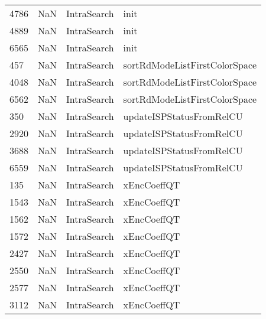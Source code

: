 \begin{tabular}{llll}
4786 &                   NaN &                IntraSearch &                                      init \\
4889 &                   NaN &                IntraSearch &                                      init \\
6565 &                   NaN &                IntraSearch &                                      init \\
457  &                   NaN &                IntraSearch &             sortRdModeListFirstColorSpace \\
4048 &                   NaN &                IntraSearch &             sortRdModeListFirstColorSpace \\
6562 &                   NaN &                IntraSearch &             sortRdModeListFirstColorSpace \\
350  &                   NaN &                IntraSearch &                  updateISPStatusFromRelCU \\
2920 &                   NaN &                IntraSearch &                  updateISPStatusFromRelCU \\
3688 &                   NaN &                IntraSearch &                  updateISPStatusFromRelCU \\
6559 &                   NaN &                IntraSearch &                  updateISPStatusFromRelCU \\
135  &                   NaN &                IntraSearch &                               xEncCoeffQT \\
1543 &                   NaN &                IntraSearch &                               xEncCoeffQT \\
1562 &                   NaN &                IntraSearch &                               xEncCoeffQT \\
1572 &                   NaN &                IntraSearch &                               xEncCoeffQT \\
2427 &                   NaN &                IntraSearch &                               xEncCoeffQT \\
2550 &                   NaN &                IntraSearch &                               xEncCoeffQT \\
2577 &                   NaN &                IntraSearch &                               xEncCoeffQT \\
3112 &                   NaN &                IntraSearch &                               xEncCoeffQT \\

\end{tabular}
